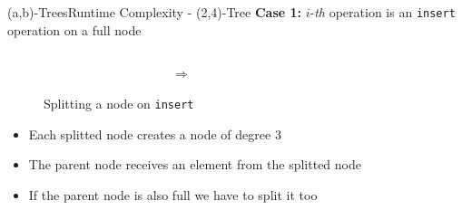 


\begin{frame}{(a,b)-Trees}{Runtime Complexity - (2,4)-Tree}
  \textbf{Case 1:}
  {\color{Mittel-Blau}$i$}-\textit{th} operation is an
  \texttt{\color{Mittel-Blau}insert} operation on a full node
  \begin{figure}
    \begin{columns}
      \begin{column}{0.35\linewidth}
        \begin{adjustbox}{width=\linewidth}
          
        \end{adjustbox}
      \end{column}
      \begin{column}{0.1\linewidth}
        \begin{center}
          $\Rightarrow$
        \end{center}
      \end{column}
      \begin{column}{0.35\linewidth}
        \begin{adjustbox}{width=\linewidth}
          
        \end{adjustbox}
      \end{column}
    \end{columns}
    \caption{Splitting a node on \texttt{\color{Mittel-Blau}insert}}
    \label{fig:a_b_tree:node_split_potential}
  \end{figure}
  \begin{itemize}
    \item<3->
      Each splitted node creates a node of {\color{Mittel-Blau}degree 3}
    \item<4->
      The parent node receives an element from the splitted node
    \item<5->
      If the parent node is also full we have to split it too
  \end{itemize}
\end{frame}

